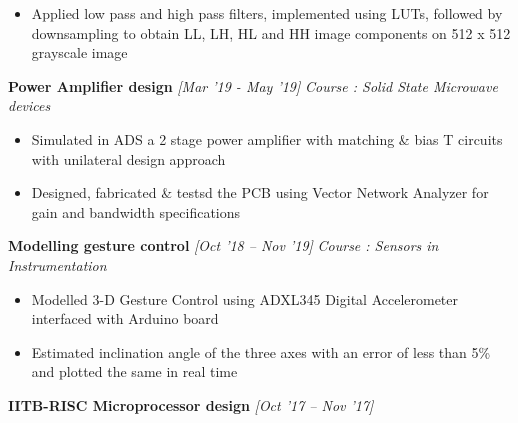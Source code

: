 \documentclass[10 pt]{article}%
\begin{document}
{{\begin{itemize}[leftmargin=*]
\item Applied low pass and high pass filters, implemented using LUTs, followed by downsampling to obtain LL, LH, HL and HH image components on 512 x 512 grayscale image
	\end{itemize}
{\flushleft \textbf {\large{Power Amplifier design}} \hfill {{{\em{[Mar '19 - May '19]}}}}
	\vspace{-0.8em}
	{\flushleft \em{Course : Solid State Microwave devices}}
	\vspace{-5pt}
	\begin{itemize}[leftmargin=*]
		\setlength\itemsep{1.5pt}
		\setlength\parskip{1.5pt}
		\item Simulated in ADS a 2 stage power amplifier with matching \& bias T circuits with unilateral design approach
		\item Designed, fabricated \& testsd the PCB using Vector Network Analyzer for gain and bandwidth specifications
	\end{itemize}
{\flushleft \textbf {\large{Modelling gesture control}} \hfill {{{\em{[Oct '18 – Nov '19]}}}}
	\vspace{-0.8em}
	{\flushleft \em{Course : Sensors in Instrumentation}}
	\vspace{-5pt}
	\begin{itemize}[leftmargin=*]
		\setlength\itemsep{1.5pt}
\setlength\parskip{1.5pt}
		\item Modelled 3-D Gesture Control using ADXL345 Digital Accelerometer interfaced with Arduino board
		\item Estimated inclination angle of the three axes with an error of less than 5\% and plotted the same in real time
	\end{itemize}
{\flushleft \textbf {\large{IITB-RISC Microprocessor design}} \hfill {{{\em{[Oct '17 – Nov '17]}}}}
}}}}}
\end{document}
